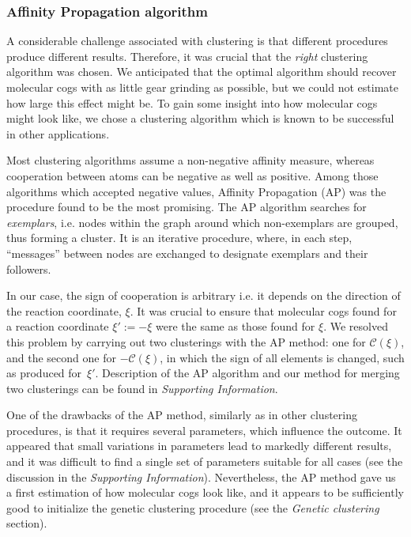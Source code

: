 \documentclass[a4paper,11pt,twoside]{book}%
\begin{document}
\subsubsection{Affinity Propagation algorithm}
A considerable challenge associated with clustering is that different procedures produce different results.
Therefore, it was crucial that the \emph{right} clustering algorithm was chosen.
We anticipated that the optimal algorithm should recover molecular cogs with as little gear grinding as possible, but we could not estimate how large this effect might be.
To gain some insight into how molecular cogs might look like, we chose a clustering algorithm which is known to be successful in other applications.

Most clustering algorithms assume a non-negative affinity measure, whereas cooperation between atoms can be negative as well as positive.
Among those algorithms which accepted negative values, Affinity Propagation (AP) was the procedure found to be the most promising\cite{frey2007clustering}.
The AP algorithm searches for \emph{exemplars}, i.e. nodes within the graph around which non-exemplars are grouped, thus forming a cluster.
It is an iterative procedure, where, in each step, ``messages'' between nodes are exchanged to designate exemplars and their followers.

In our case, the sign of cooperation is arbitrary i.e. it depends on the direction of the reaction coordinate, $\xi$.
It was crucial to ensure that molecular cogs found for a reaction coordinate $\xi':=-\xi$ were the same as those found for $\xi$.
We resolved this problem by carrying out two clusterings with the AP method: one for $\mathcal{C}(\xi)$, and the second one for $-\mathcal{C}(\xi)$, in which the sign of all elements is changed, such as produced for~$\xi'$.
Description of the AP algorithm and our method for merging two clusterings can be found in \emph{Supporting Information}.

One of the drawbacks of the AP method, similarly as in other clustering procedures, is that it requires several parameters, which influence the outcome.
It appeared that small variations in parameters lead to markedly different results, and it was difficult to find a single set of parameters suitable for all cases (see the discussion in the \emph{Supporting Information}).
Nevertheless, the AP method gave us a first estimation of how molecular cogs look like, and it appears to be sufficiently good to initialize the genetic clustering procedure (see the \emph{Genetic clustering} section).
\end{document}
